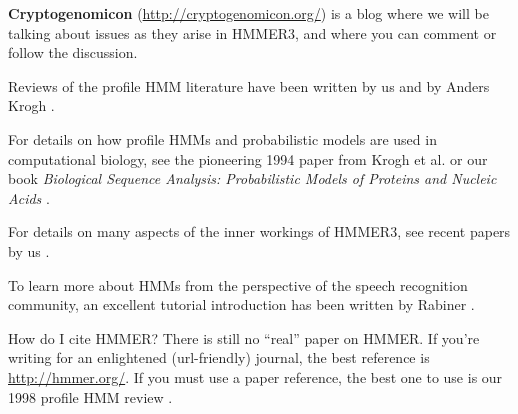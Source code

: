 \textbf{Cryptogenomicon} (\url{http://cryptogenomicon.org/}) is a blog
where we will be talking about issues as they arise in HMMER3, and
where you can comment or follow the discussion.

Reviews of the profile HMM literature have been written by us
\citep{Eddy96,Eddy98} and by Anders Krogh \citep{Krogh98}.

For details on how profile HMMs and probabilistic models are used in
computational biology, see the pioneering 1994 paper from Krogh et
al. \citep{Krogh94} or our book \emph{Biological Sequence Analysis:
Probabilistic Models of Proteins and Nucleic Acids} \citep{Durbin98}.

For details on many aspects of the inner workings
of HMMER3, see recent papers by us \citep{Eddy09b,Eddy11}.

To learn more about HMMs from the perspective of the speech
recognition community, an excellent tutorial introduction has been
written by Rabiner \citep{Rabiner89}.

\begin{srefaq}{How do I cite HMMER?}
There is still no ``real'' paper on HMMER. If you're writing for an
enlightened (url-friendly) journal, the best reference is
\url{http://hmmer.org/}.
If you must use a paper reference, the best one to use is our 1998
profile HMM review \citep{Eddy98}.
\end{srefaq}















  










